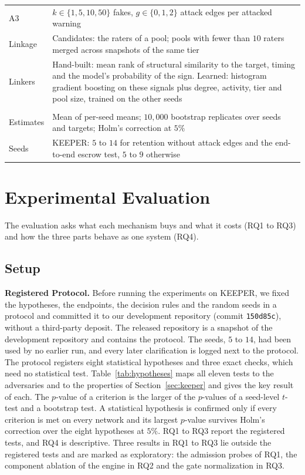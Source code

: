 \documentclass[lettersize,journal]{IEEEtran}
\begin{document}
\begin{table}[!t]
\begin{tabular}[t]{@{}>{\raggedright\arraybackslash}p{}>{\raggedright\arraybackslash}p{}@{}}
A3 & $k \in \{1, 5, 10, 50\}$ fakes, $g \in \{0, 1, 2\}$ attack edges per attacked warning \\
Linkage & Candidates: the raters of a pool; pools with fewer than $10$ raters merged across snapshots of the same tier \\
Linkers & Hand-built: mean rank of structural similarity to the target, timing and the model's probability of the sign. Learned: histogram gradient boosting on these signals plus degree, activity, tier and pool size, trained on the other seeds \\
\midrule
\multicolumn{2}{@{}l}{\textbf{Statistics}} \\[1pt]
Estimates & Mean of per-seed means; $10{,}000$ bootstrap replicates over seeds and targets; Holm's correction at $5\%$ \\
Seeds & KEEPER: $5$ to $14$ for retention without attack edges and the end-to-end escrow test, $5$ to $9$ otherwise \\
\bottomrule
\end{tabular}
\end{table}

\section{Experimental Evaluation}
\label{sec:results}

The evaluation asks what each mechanism buys and what it costs (RQ1 to RQ3) and how the three parts behave as one system (RQ4).

\subsection{Setup}
\label{subsec:datasets}

\noindent\textbf{Registered Protocol.}
Before running the experiments on KEEPER, we fixed the hypotheses, the endpoints, the decision rules and the random seeds in a protocol and committed it to our development repository (commit \texttt{150d85c}), without a third-party deposit. The released repository is a snapshot of the development repository and contains the protocol.
The seeds, $5$ to $14$, had been used by no earlier run, and every later clarification is logged next to the protocol.
The protocol registers eight statistical hypotheses and three exact checks, which need no statistical test. Table~\ref{tab:hypotheses} maps all eleven tests to the adversaries and to the properties of Section~\ref{sec:keeper} and gives the key result of each.
The $p$-value of a criterion is the larger of the $p$-values of a seed-level $t$-test and a bootstrap test.
A statistical hypothesis is confirmed only if every criterion is met on every network and its largest $p$-value survives Holm's correction over the eight hypotheses at $5\%$.
RQ1 to RQ3 report the registered tests, and RQ4 is descriptive.
Three results in RQ1 to RQ3 lie outside the registered tests and are marked as exploratory: the admission probes of RQ1, the component ablation of the engine in RQ2 and the gate normalization in RQ3.
\end{document}
